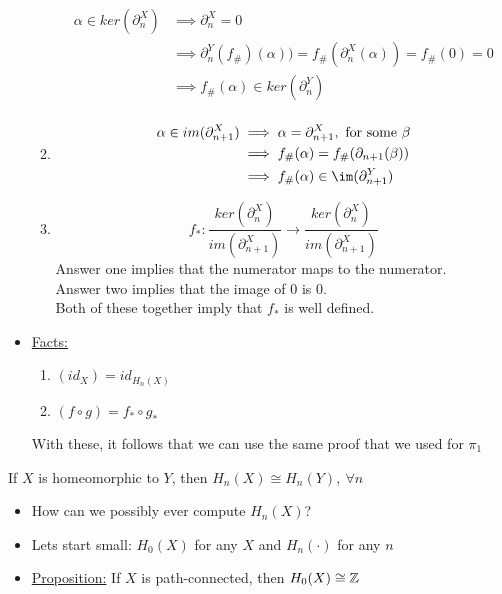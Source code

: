 \documentclass[../notes.tex]{subfiles}
\begin{document}
\begin{itemize}
\begin{enumerate}
\begin{align*}
                    \alpha\in ker(\partial_n^X)&\implies \partial_n^{X}=0\\
                    &\implies \partial_n^{Y}(f_{\#})(\alpha))=f_{\#}(\partial_n^X(\alpha))
                    =f_{\#}(0)=0\\
                    &\implies f_{\#}(\alpha)\in ker(\partial_n^Y)\\
                \end{align*}
            \item
                \begin{align*}
                    \alpha \in im(\partial_{n+1}^X)&\implies
                    \alpha=\partial_{n+1}^X,\ \text{for some $\beta$}\\
                    &\implies f_{\#}(\alpha)=f_{\#}(\partial_{n+1}(\beta))\\
                    &\implies f_{\#}(\alpha)\in\im(\partial_{n+1}^Y)\\
                \end{align*}
            \item
                \[
                    f_{*}:\frac{ker(\partial_n^X)}{im(\partial_{n+1}^X)}
                    \rightarrow \frac{ker(\partial_n^X)}{im(\partial_{n+1}^X)}
                \]
                Answer one implies that the numerator maps to the numerator.\\
                Answer two implies that the image of $0$ is $0$.\\
                Both of these together imply that $f_{*}$ is well defined.
        \end{enumerate}
    \item \underline{Facts:}
        \begin{enumerate}
            \item $(id_X)=id_{H_n(X)}$
            \item $(f\circ g)=f_{*}\circ g_{*}$
        \end{enumerate}
        With these, it follows that we can use the same proof that we used for $\pi_1$
\end{itemize}
\begin{theorem}
    If $X$ is homeomorphic to $Y$, then $H_n(X)\cong H_n(Y),\ \forall n$
\end{theorem}
\begin{itemize}
    \item How can we possibly ever compute $H_n(X)$?
    \item Lets start small: $H_0(X)$ for any $X$ and $H_n(\cdot)$ for any $n$
    \item \underline{Proposition:} If $X$ is path-connected, then $H_0(X)\cong \mathbb{Z}$
\end{itemize}
\end{document}
